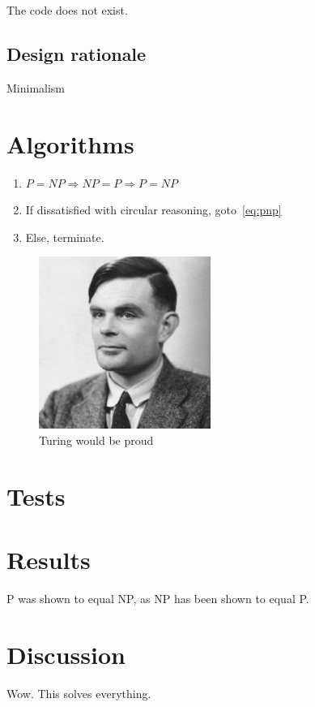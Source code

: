 \documentclass[a4paper, twoside]{article}
\begin{document}
The code does not exist.

\subsection{Design rationale} %

Minimalism

\section{Algorithms} %

\begin{enumerate}
\item \label{eq:pnp}$P=NP \Rightarrow NP=P \Rightarrow P=NP $
\item If dissatisfied with circular reasoning, goto~\ref{eq:pnp}
\item Else, terminate.
\end{enumerate}

\begin{figure}[h!]
  \centering
  \includegraphics[width=0.5\textwidth]{img/turing-portrait.jpg}
  \caption{Turing would be proud}
  \label{fig:turing}
\end{figure}

\section{Tests} %

\section{Results} %

P was shown to equal NP, as NP has been shown to equal P.

\section{Discussion} %

Wow. This solves everything.\cite{Turing-machines}\cite{dijkstra-testing}

\printbibliography
\end{document}
